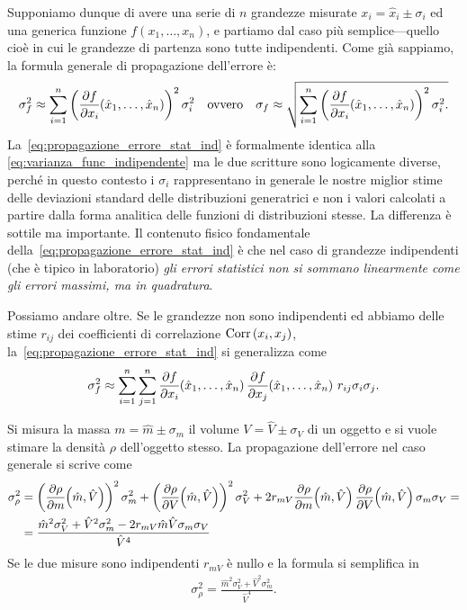 Supponiamo dunque di avere una serie di $n$ grandezze misurate
$x_i = \hat{x}_i \pm \sigma_i$ ed una generica funzione $f(x_1, \ldots, x_n)$,
e partiamo dal caso più semplice---quello cioè in cui le grandezze di
partenza sono tutte indipendenti. Come già sappiamo, la formula generale di
propagazione dell'errore è:
\begin{align}\label{eq:propagazione_errore_stat_ind}
  \sigma^2_f \approx
  \sum_{i = 1}^n
  \left(\pd{f}{x_i}{\hat{x}_1,\ldots,\hat{x}_n}\right)^2 \sigma^2_i
  \quad \text{ovvero} \quad
  \sigma_f \approx \sqrt{\sum_{i = 1}^n
    \left(\pd{f}{x_i}{\hat{x}_1,\ldots,\hat{x}_n}\right)^2 \sigma^2_i.
  }
\end{align}
La~\eqref{eq:propagazione_errore_stat_ind} è formalmente identica alla
\eqref{eq:varianza_func_indipendente} ma le due scritture sono logicamente
diverse, perché in questo contesto i $\sigma_i$ rappresentano in generale le
nostre miglior stime delle deviazioni standard delle distribuzioni generatrici e
non i valori calcolati a partire dalla forma analitica delle funzioni di
distribuzioni stesse. La differenza è sottile ma importante. Il contenuto
fisico fondamentale della~\eqref{eq:propagazione_errore_stat_ind} è che nel
caso di grandezze indipendenti (che è tipico in laboratorio) \emph{gli errori
  statistici non si sommano linearmente come gli errori massimi, ma in
  quadratura}.

Possiamo andare oltre. Se le grandezze non sono indipendenti ed abbiamo delle
stime $r_{ij}$ dei coefficienti di correlazione $\text{Corr}\left(x_i, x_j\right)$,
la~\ref{eq:propagazione_errore_stat_ind} si generalizza come
\begin{align}\label{eq:propagazione_errore_stat}
  \sigma^2_f \approx
  \sum_{i = 1}^n \sum_{j = 1}^n
  \pd{f}{x_i}{\hat{x}_1,\ldots,\hat{x}_n}
  \pd{f}{x_j}{\hat{x}_1,\ldots,\hat{x}_n} \, r_{ij}\sigma_i\sigma_j.
\end{align}

\begin{examplebox}
  \begin{example}\label{eq:prop_errore_densita}
    Si misura la massa $m = \hat{m} \pm \sigma_m$ il volume
    $V = \hat{V} \pm \sigma_V$ di un oggetto e si vuole stimare la densità
    $\rho$ dell'oggetto stesso. La propagazione dell'errore nel caso generale si
    scrive come
    \begin{align*}
      \sigma^2_\rho & =
      \left( \pd{\rho}{m}{\hat{m}, \hat{V}} \right)^2 \sigma_m^2 +
      \left( \pd{\rho}{V}{\hat{m}, \hat{V}} \right)^2 \sigma_V^2 +
      2r_{mV} \pd{\rho}{m}{\hat{m}, \hat{V}}
      \pd{\rho}{V}{\hat{m}, \hat{V}}\sigma_m \sigma_V =\\
      & = \frac{\hat{m}^2 \sigma_V^2 + \hat{V}^2 \sigma_m^2 -
        2r_{mV}\hat{m}\hat{V}\sigma_m \sigma_V}{\hat{V}^4}
    \end{align*}
    Se le due misure sono indipendenti $r_{mV}$ è nullo e la formula si
    semplifica in
    \begin{align*}
      \sigma^2_\rho =
      \frac{\hat{m}^2 \sigma_V^2 + \hat{V}^2 \sigma_m^2}{\hat{V}^4}.
    \end{align*}
  \end{example}
\end{examplebox}



